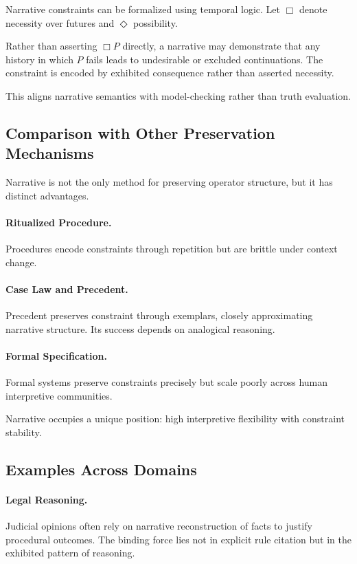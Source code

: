 \documentclass[11pt]{article}
\begin{document}
Narrative constraints can be formalized using temporal logic. Let $\Box$ denote
necessity over futures and $\Diamond$ possibility.

Rather than asserting $\Box P$ directly, a narrative may demonstrate that any
history in which $P$ fails leads to undesirable or excluded continuations. The
constraint is encoded by exhibited consequence rather than asserted necessity.

This aligns narrative semantics with model-checking rather than truth
evaluation.

\subsection{Comparison with Other Preservation Mechanisms}

Narrative is not the only method for preserving operator structure, but it has
distinct advantages.

\paragraph{Ritualized Procedure.}
Procedures encode constraints through repetition but are brittle under context
change.

\paragraph{Case Law and Precedent.}
Precedent preserves constraint through exemplars, closely approximating narrative
structure. Its success depends on analogical reasoning.

\paragraph{Formal Specification.}
Formal systems preserve constraints precisely but scale poorly across human
interpretive communities.

Narrative occupies a unique position: high interpretive flexibility with
constraint stability.

\subsection{Examples Across Domains}

\paragraph{Legal Reasoning.}
Judicial opinions often rely on narrative reconstruction of facts to justify
procedural outcomes. The binding force lies not in explicit rule citation but in
the exhibited pattern of reasoning.
\end{document}
